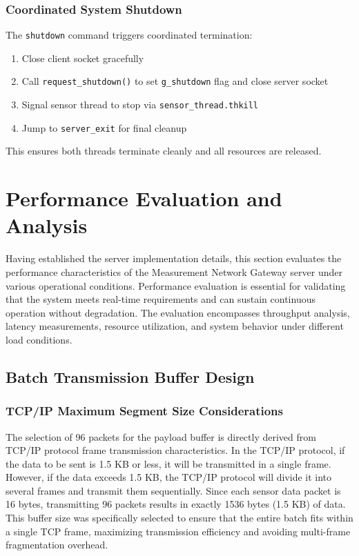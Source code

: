 \subsubsection{Coordinated System Shutdown}

The \texttt{shutdown} command triggers coordinated termination:
\begin{enumerate}
	\item Close client socket gracefully
	\item Call \texttt{request\_shutdown()} to set \texttt{g\_shutdown} flag and close server socket
	\item Signal sensor thread to stop via \texttt{sensor\_thread.thkill}
	\item Jump to \texttt{server\_exit} for final cleanup
\end{enumerate}

This ensures both threads terminate cleanly and all resources are released.


\section{Performance Evaluation and Analysis}
Having established the server implementation details, this section evaluates the performance characteristics of the Measurement Network Gateway server under various operational conditions. Performance evaluation is essential for validating that the system meets real-time requirements and can sustain continuous operation without degradation. The evaluation encompasses throughput analysis, latency measurements, resource utilization, and system behavior under different load conditions.

\subsection{Batch Transmission Buffer Design}

\subsubsection{TCP/IP Maximum Segment Size Considerations}

The selection of 96 packets for the payload buffer is directly derived from TCP/IP protocol frame transmission characteristics. In the TCP/IP protocol, if the data to be sent is 1.5 KB or less, it will be transmitted in a single frame. However, if the data exceeds 1.5 KB, the TCP/IP protocol will divide it into several frames and transmit them sequentially. Since each sensor data packet is 16 bytes, transmitting 96 packets results in exactly 1536 bytes (1.5 KB) of data. This buffer size was specifically selected to ensure that the entire batch fits within a single TCP frame, maximizing transmission efficiency and avoiding multi-frame fragmentation overhead.


